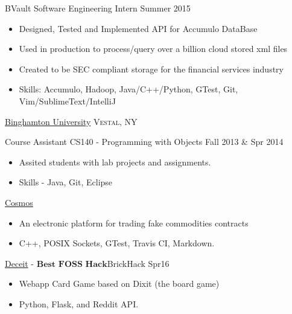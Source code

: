 \documentclass[11pt]{article}
\begin{document}
\headedsection  %
{}
{} {
    \headedsubsection
    {BVault Software Engineering Intern}
    {Summer 2015}
    {
        \begin{itemize}
            \item Designed, Tested and Implemented API for Accumulo DataBase
            \item Used in production to process/query over a billion cloud stored xml files
            \item Created to be SEC compliant storage for the financial services industry
            \item Skills: Accumulo, Hadoop, Java/C++/Python, GTest, Git, Vim/SublimeText/IntelliJ
        \end{itemize}
    }
}

\headedsection
{\href{}{Binghamton University}}
{\textsc{Vestal, NY}} {
    \headedsubsection
    {Course Assistant CS140 - Programming with Objects}
    {Fall 2013 \& Spr 2014}
    {
        \begin{itemize}
            \item Assited students with lab projects and assignments.
            \item Skills - Java, Git, Eclipse
        \end{itemize}
    }
}


\spacedhrule{0.1em}{0.5em}  %


\projects
{{\href{https://github.com/gabeochoa/Cosmos}{Cosmos}}}{}
{
    \begin{itemize}[label={}]
        \setlength\itemsep{.005ex}
        \item{An electronic platform for trading fake commodities contracts}
        \item{C++, POSIX Sockets, GTest, Travis CI, Markdown.}
    \end{itemize}
}

\projects
{{\href{https://github.com/gabeochoa/sokim}{Deceit}} - $\textbf{Best FOSS Hack}$}{BrickHack Spr16}
{
    \begin{itemize}[label={}]
        \setlength\itemsep{.005ex}
        \item{Webapp Card Game based on Dixit (the board game)}
        \item{Python, Flask, and Reddit API.}
    \end{itemize}
}
\end{document}
